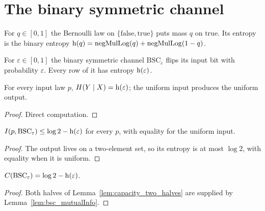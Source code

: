 \chapter{The binary symmetric channel}
\label{chap:bsc}

\begin{definition}
  \label{def:bernoulli}
  \leanok
  For $q \in [0, 1]$ the Bernoulli law on $\{\mathrm{false}, \mathrm{true}\}$ puts mass $q$ on
  $\mathrm{true}$.  Its entropy is the binary entropy
  $\operatorname{h}(q) = \operatorname{negMulLog}(q) + \operatorname{negMulLog}(1 - q)$.
\end{definition}

\begin{definition}
  \label{def:bsc}
  \leanok
  For $\varepsilon \in [0, 1]$ the binary symmetric channel $\mathrm{BSC}_\varepsilon$ flips its input
  bit with probability $\varepsilon$.  Every row of it has entropy $\operatorname{h}(\varepsilon)$.
\end{definition}

\begin{lemma}
  \label{lem:bsc_condEntropy}
  \leanok
  For every input law $p$, $H(Y \mid X) = \operatorname{h}(\varepsilon)$; the uniform input produces the
  uniform output.
\end{lemma}
\begin{proof}
  \leanok
  Direct computation.
\end{proof}

\begin{lemma}
  \label{lem:bsc_mutualInfo}
  \leanok
  $I(p, \mathrm{BSC}_\varepsilon) \le \log 2 - \operatorname{h}(\varepsilon)$ for every $p$, with equality for the
  uniform input.
\end{lemma}
\begin{proof}
  \leanok
  The output lives on a two-element set, so its entropy is at most $\log 2$, with equality when it
  is uniform.
\end{proof}

\begin{theorem}
  \label{thm:capacity_bsc}
  \leanok
  $C(\mathrm{BSC}_\varepsilon) = \log 2 - \operatorname{h}(\varepsilon)$.
\end{theorem}
\begin{proof}
  \leanok
  Both halves of Lemma~\ref{lem:capacity_two_halves} are supplied by Lemma~\ref{lem:bsc_mutualInfo}.
\end{proof}
